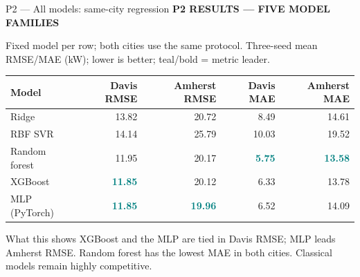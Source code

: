 \documentclass[aspectratio=169,11pt]{beamer}
\newcommand{\sectiontag}[1]{{\footnotesize\usebeamercolor[fg]{structure}\textbf{#1}}\par\vspace{0.10cm}}
\newcommand{\smallmuted}[1]{{\footnotesize\color{slate}#1\par}}
\begin{document}
\begin{frame}{P2 — All models: same-city regression}
\sectiontag{P2 \quad RESULTS — FIVE MODEL FAMILIES}
\smallmuted{Fixed model per row; both cities use the same protocol. Three-seed mean RMSE/MAE (kW); lower is better; teal/bold = metric leader.}
\vspace{0.22cm}
{\footnotesize
\setlength{\tabcolsep}{7pt}
\renewcommand{\arraystretch}{1.36}
\centering
\begin{tabular}{@{}lrrrr@{}}\toprule
\textbf{Model} & \textbf{Davis RMSE} & \textbf{Amherst RMSE} & \textbf{Davis MAE} & \textbf{Amherst MAE}\\\midrule
Ridge & 13.82 & 20.72 & 8.49 & 14.61\\
RBF SVR & 14.14 & 25.79 & 10.03 & 19.52\\
Random forest & 11.95 & 20.17 & \textcolor{teal}{\textbf{5.75}} & \textcolor{teal}{\textbf{13.58}}\\
XGBoost & \textcolor{teal}{\textbf{11.85}} & 20.12 & 6.33 & 13.78\\
MLP (PyTorch) & \textcolor{teal}{\textbf{11.85}} & \textcolor{teal}{\textbf{19.96}} & 6.52 & 14.09\\
\bottomrule\end{tabular}}
\vspace{0.12cm}
\begin{block}{What this shows}
\footnotesize XGBoost and the MLP are tied in Davis RMSE; MLP leads Amherst RMSE. Random forest has the lowest MAE in both cities. Classical models remain highly competitive.
\end{block}
\end{frame}
\end{document}
